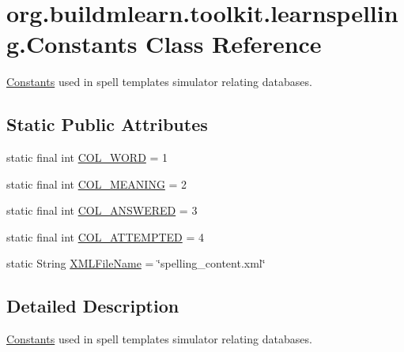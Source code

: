 \hypertarget{classorg_1_1buildmlearn_1_1toolkit_1_1learnspelling_1_1Constants}{}\section{org.\+buildmlearn.\+toolkit.\+learnspelling.\+Constants Class Reference}
\label{classorg_1_1buildmlearn_1_1toolkit_1_1learnspelling_1_1Constants}


\hyperlink{classorg_1_1buildmlearn_1_1toolkit_1_1learnspelling_1_1Constants}{Constants} used in spell template\textquotesingle{}s simulator relating databases.  


\subsection*{Static Public Attributes}
\begin{DoxyCompactItemize}
\item 
static final int \hyperlink{classorg_1_1buildmlearn_1_1toolkit_1_1learnspelling_1_1Constants_a63a5b9cadfe24d9f838df27c3d89ce22}{C\+O\+L\+\_\+\+W\+O\+RD} = 1
\item 
static final int \hyperlink{classorg_1_1buildmlearn_1_1toolkit_1_1learnspelling_1_1Constants_a439ff1d2fc63d5939a3a507bb11d8fed}{C\+O\+L\+\_\+\+M\+E\+A\+N\+I\+NG} = 2
\item 
static final int \hyperlink{classorg_1_1buildmlearn_1_1toolkit_1_1learnspelling_1_1Constants_a8d4929940f55d0a97b514e0ba5fae119}{C\+O\+L\+\_\+\+A\+N\+S\+W\+E\+R\+ED} = 3
\item 
static final int \hyperlink{classorg_1_1buildmlearn_1_1toolkit_1_1learnspelling_1_1Constants_a7fb227a88838d2708d6e7d884aa27912}{C\+O\+L\+\_\+\+A\+T\+T\+E\+M\+P\+T\+ED} = 4
\item 
static String \hyperlink{classorg_1_1buildmlearn_1_1toolkit_1_1learnspelling_1_1Constants_a2d1e69d562df209e512be480e8fd2e3d}{X\+M\+L\+File\+Name} = \char`\"{}spelling\+\_\+content.\+xml\char`\"{}
\end{DoxyCompactItemize}


\subsection{Detailed Description}
\hyperlink{classorg_1_1buildmlearn_1_1toolkit_1_1learnspelling_1_1Constants}{Constants} used in spell template\textquotesingle{}s simulator relating databases. 

